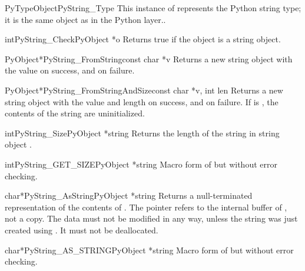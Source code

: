 \documentclass{manual}
\begin{document}
\begin{cvardesc}{PyTypeObject}{PyString_Type}
This instance of  represents the Python string
type; it is the same object as  in the Python
layer..
\end{cvardesc}

\begin{cfuncdesc}{int}{PyString_Check}{PyObject *o}
Returns true if the object  is a string object.
\end{cfuncdesc}

\begin{cfuncdesc}{PyObject*}{PyString_FromString}{const char *v}
Returns a new string object with the value  on success, and
\NULL{} on failure.
\end{cfuncdesc}

\begin{cfuncdesc}{PyObject*}{PyString_FromStringAndSize}{const char *v,
                                                         int len}
Returns a new string object with the value  and length
 on success, and \NULL{} on failure.  If  is \NULL{},
the contents of the string are uninitialized.
\end{cfuncdesc}

\begin{cfuncdesc}{int}{PyString_Size}{PyObject *string}
Returns the length of the string in string object .
\end{cfuncdesc}

\begin{cfuncdesc}{int}{PyString_GET_SIZE}{PyObject *string}
Macro form of  but without error
checking.
\end{cfuncdesc}

\begin{cfuncdesc}{char*}{PyString_AsString}{PyObject *string}
Returns a null-terminated representation of the contents of
.  The pointer refers to the internal buffer of
, not a copy.  The data must not be modified in any way,
unless the string was just created using
.
It must not be deallocated.
\end{cfuncdesc}

\begin{cfuncdesc}{char*}{PyString_AS_STRING}{PyObject *string}
Macro form of  but without error
checking.
\end{cfuncdesc}
\end{document}
